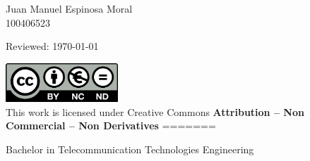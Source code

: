 \documentclass[../main.tex]{subfiles}
\begin{document}
\begin{titlepage}
\begin{sffamily}
\begin{center}
			\begin{Large}
				Juan Manuel Espinosa Moral\\
				100406523\\
			\end{Large}


		\end{center}

		\vfill

		{Reviewed: \today}\\

		\color{black}

		\includegraphics[width=4.2cm]{images/UC3M/creativecommons.png}\\
		This work is licensed under Creative Commons \textbf{Attribution – Non Commercial – Non Derivatives}
=======
	\color{azulUC3M}

	\begin{center}

		\begin{figure}[H]
		\end{figure}

		\vspace{2.5cm}

		\begin{Large}
			Bachelor in Telecommunication Technologies Engineering\\			
			\bigskip
		\end{Large}


\end{center}
\end{sffamily}
\end{titlepage}
\end{document}
